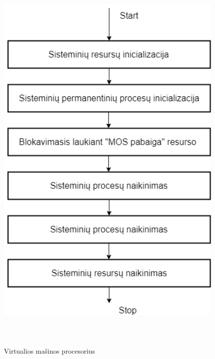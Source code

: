 \documentclass[oneside]{VUMIFPSkursinis}
\begin{document}
\begin{figure}[H]
		\centering	
	\includegraphics[width=18cm,height=20cm,keepaspectratio]{StartStop.png}
	\caption{Virtualios mašinos procesorius}
	\label{fig:Virtualios mašinos procesorius}
\end{figure}
\end{document}
